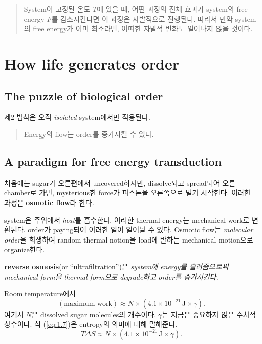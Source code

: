 \begin{quotation}
	System이 고정된 온도 $T$에 있을 때, 어떤 과정의 전체 효과가 system의 free energy $F$를 감소시킨다면 이 과정은 자발적으로 진행된다. 따라서 만약 system의 free energy가 이미 최소라면, 어떠한 자발적 변화도 일어나지 않을 것이다.
\end{quotation}

\section{How life generates order}
\subsection{The puzzle of biological order}
제2 법칙은 오직 \emph{isolated} system에서만 적용된다.

\begin{quotation}
	Energy의 flow는 order를 증가시킬 수 있다.
\end{quotation}

\subsection{A paradigm for free energy transduction}

 처음에는 sugar가 오른편에서 uncovered하지만, dissolve되고 spread되어 오른 chamber로 가면, mysterious한 force가 피스톤을 오른쪽으로 밀기 시작한다. 이러한 과정은 \textbf{osmotic flow}라 한다.

system은 주위에서 \emph{heat}를 흡수한다. 이러한 thermal energy는 mechanical work로 변환된다. order가 paying되어 이러한 일이 일어날 수 있다. Osmotic flow는 \emph{molecular order}을 희생하여 random thermal notion을 load에 반하는 mechanical motion으로 organize한다.

\textbf{reverse osmosis}(or ``ultrafiltration'')은 \emph{system에 energy를 흘려줌으로써 mechanical form을 thermal form으로 degrade하고 order를 증가시킨다.}

 Room temperature에서
\begin{equation}
	\label{eq:1.7}
	(\text{maximum work}) \approx N \times (4.1\times 10^{-21}\,\mathrm{J}\times \gamma).
\end{equation}
여기서 $N$은 dissolved sugar molecules의 개수이다. $\gamma$는 지금은 중요하지 않은 수치적 상수이다. 식 (\ref{eq:1.7})은 entropy의 의미에 대해 말해준다.
\begin{equation}
	T\Delta S \approx N \times (4.1 \times 10^{-21}\,\mathrm{J}\times\gamma).
\end{equation}


